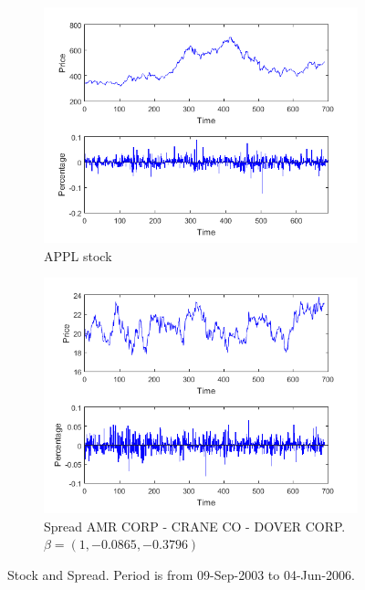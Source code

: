 \documentclass[11pt,a4,twosided,singlespacing,titlepagenumber=on]{scrreprt}
\numberwithin{equation}{chapter} %
\theoremstyle{remark}
\begin{document}
\begin{figure}[H]
    \centering
    \begin{subfigure}[t]{0.49\textwidth}
        \centering
        \includegraphics[width=1\textwidth]{apple_2003_2006}
        \caption{APPL stock}
        \label{apple_2003_2006}
    \end{subfigure}
    \begin{subfigure}[t]{0.49\textwidth}
        \centering
        \includegraphics[width=1\textwidth]{spread_amr_crane_2003_2006}
        \caption{Spread AMR CORP - CRANE CO - DOVER CORP. $\beta = (1, -0.0865, -0.3796)$}
        \label{spread_amr_crane_2003_2006}
    \end{subfigure}
    \caption{Stock and Spread. Period is from 09-Sep-2003 to 04-Jun-2006.}
\end{figure}
\end{document}
